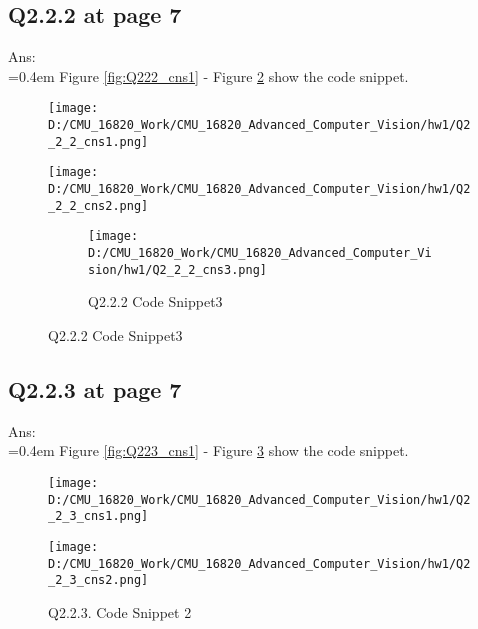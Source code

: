 \documentclass{article}
\begin{document}
	\subsection*{Q2.2.2 at page 7}
	Ans:\\
	\hangindent=0.4em \hspace{0.3em} Figure \ref{fig:Q222_cns1} - Figure \ref{fig:Q222_cns3} show the code snippet.
	\begin{figure}[H]
	\centering
	\begin{minipage}[b]{0.45\textwidth}
		\centering
		\texttt{[image: D:/CMU\_16820\_Work/CMU\_16820\_Advanced\_Computer\_Vision/hw1/Q2\_2\_2\_cns1.png]}  %
		\caption{Q2.2.2 Code Snippet 1}
		\label{fig:Q222_cns1}
	\end{minipage}
	\hfill  %
	\begin{minipage}[b]{0.45\textwidth}
		\centering
		\texttt{[image: D:/CMU\_16820\_Work/CMU\_16820\_Advanced\_Computer\_Vision/hw1/Q2\_2\_2\_cns2.png]}  %
		\caption{Q2.2.2. Code Snippet 2}
		\label{fig:Q222_csn2}
	\end{minipage}
	\begin{figure}[H]		
		\centering
		\texttt{[image: D:/CMU\_16820\_Work/CMU\_16820\_Advanced\_Computer\_Vision/hw1/Q2\_2\_2\_cns3.png]}  %
		\caption{Q2.2.2 Code Snippet3}
		\label{fig:Q222_cns3}
	\end{figure}	
	\end{figure}
	
	\newpage
	\subsection*{Q2.2.3 at page 7}
	Ans:\\
	\hangindent=0.4em \hspace{0.3em} Figure \ref{fig:Q223_cns1} - Figure \ref{fig:Q223_csn2} show the code snippet.
	\begin{figure}[H]
	\centering
	\begin{minipage}[b]{0.45\textwidth}
		\centering
		\texttt{[image: D:/CMU\_16820\_Work/CMU\_16820\_Advanced\_Computer\_Vision/hw1/Q2\_2\_3\_cns1.png]}  %
		\caption{Q2.2.3 Code Snippet 1}
		\label{fig:Q223_cns1}
	\end{minipage}
	\hfill  %
	\begin{minipage}[b]{0.45\textwidth}
		\centering
		\texttt{[image: D:/CMU\_16820\_Work/CMU\_16820\_Advanced\_Computer\_Vision/hw1/Q2\_2\_3\_cns2.png]}  %
		\caption{Q2.2.3. Code Snippet 2}
		\label{fig:Q223_csn2}
	\end{minipage}	
	\end{figure}
	
\end{document}
